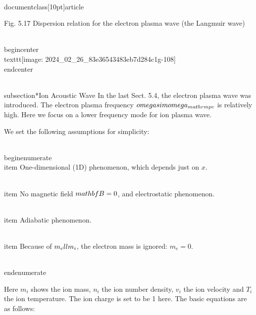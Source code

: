 \\documentclass[10pt]{article}
\begin{document}
{{{Fig. 5.17 Dispersion relation for the electron plasma wave (the Langmuir wave)

\\begin{center}
\\texttt{[image: 2024\_02\_26\_83e36543483eb7d284c1g-108]}
\\end{center}

\\subsection*{Ion Acoustic Wave}
In the last Sect. 5.4, the electron plasma wave was introduced. The electron plasma frequency $\\omega \\sim \\omega_{\\mathrm{pe}}$ is relatively high. Here we focus on a lower frequency mode for ion plasma wave.

We set the following assumptions for simplicity:

\\begin{enumerate}
  \\item One-dimensional (1D) phenomenon, which depends just on $x$.

  \\item No magnetic field $\\mathbf{B}=0$, and electrostatic phenomenon.

  \\item Adiabatic phenomenon.

  \\item Because of $m_{e} \\ll m_{i}$, the electron mass is ignored: $m_{e}=0$.

\\end{enumerate}

Here $m_{i}$ shows the ion mass, $n_{i}$ the ion number density, $v_{i}$ the ion velocity and $T_{i}$ the ion temperature. The ion charge is set to be 1 here. The basic equations are as follows:

}}}
\end{document}
